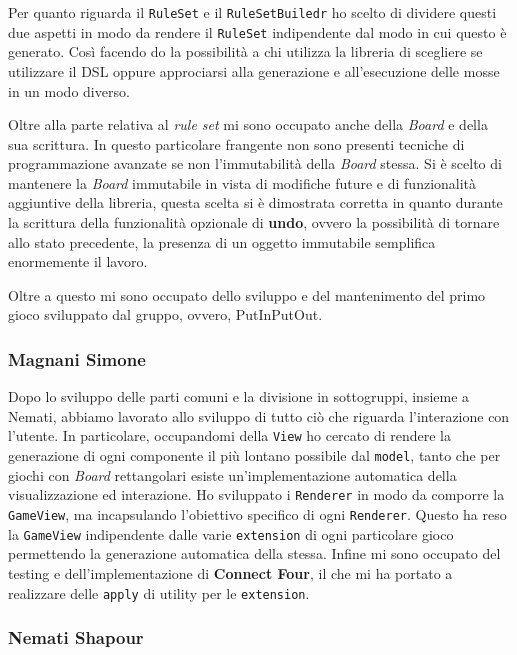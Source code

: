 Per quanto riguarda il \texttt{RuleSet} e il \texttt{RuleSetBuiledr} ho scelto di dividere questi due aspetti in modo da rendere il \texttt{RuleSet} indipendente dal modo in cui questo è generato.
%
Così facendo do la possibilità a chi utilizza la libreria di scegliere se utilizzare il DSL oppure approciarsi alla generazione e all'esecuzione delle mosse in un modo diverso.

Oltre alla parte relativa al \textit{rule set} mi sono occupato anche della \textit{Board} e della sua scrittura.
%
In questo particolare frangente non sono presenti tecniche di programmazione avanzate se non l'immutabilità della \textit{Board} stessa.
%
Si è scelto di mantenere la \textit{Board} immutabile in vista di modifiche future e di funzionalità aggiuntive della libreria, questa scelta si è dimostrata corretta in quanto durante la scrittura della funzionalità opzionale di \textbf{undo}, ovvero la possibilità di tornare allo stato precedente, la presenza di un oggetto immutabile semplifica enormemente il lavoro.

Oltre a questo mi sono occupato dello sviluppo e del mantenimento del primo gioco sviluppato dal gruppo, ovvero, PutInPutOut.


\subsubsection{Magnani Simone}
Dopo lo sviluppo delle parti comuni e la divisione in sottogruppi, insieme a Nemati, abbiamo lavorato allo sviluppo di tutto ciò che riguarda l'interazione con l'utente.
In particolare, occupandomi della \texttt{View} ho cercato di rendere la generazione di ogni componente il più lontano possibile dal \texttt{model}, tanto che per giochi con \textit{Board} rettangolari esiste un'implementazione automatica della visualizzazione ed interazione.
Ho sviluppato i \texttt{Renderer} in modo da comporre la \texttt{GameView}, ma incapsulando l'obiettivo specifico di ogni \texttt{Renderer}.
%
Questo ha reso la \texttt{GameView} indipendente dalle varie \texttt{extension} di ogni particolare gioco permettendo la generazione automatica della stessa.
Infine mi sono occupato del testing e dell'implementazione di \textbf{Connect Four}, il che mi ha portato a realizzare delle \texttt{apply} di utility per le \texttt{extension}.

\subsubsection{Nemati Shapour}
